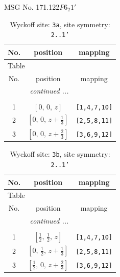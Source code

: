 \documentclass[fleqn,8pt]{jsarticle}
\begin{document}
\setcounter{MaxMatrixCols}{32}

\renewcommand{\tablename}{Table~}
\renewcommand{\figurename}{Figure~}
\begin{center}
\LARGE
MSG No. 171.122\quad$P6_{2}1'$
\end{center}
\renewcommand{\arraystretch}{1.2}
\begin{longtable}{ccc}
\caption{Wyckoff site: {\tt 3a}, site symmetry: {\tt 2..1'}}
 \\
 \hline \hline
No. & position & mapping \\ \hline \endfirsthead

\multicolumn{2}{l}{\tablename\ \thetable{}} \\
 \hline \hline
No. & position & mapping \\ \hline \endhead

 \hline \hline
\multicolumn{2}{r}{\footnotesize\it continued ...} \\ \endfoot

 \hline \hline
\multicolumn{2}{r}{} \\ \endlastfoot

1 & $\left[ 0,\, 0,\, z \right]$ & {\tt [1,4,7,10]} \\ \hline
2 & $\left[ 0,\, 0,\, z + \frac{1}{3} \right]$ & {\tt [2,5,8,11]} \\ \hline
3 & $\left[ 0,\, 0,\, z + \frac{2}{3} \right]$ & {\tt [3,6,9,12]} \\
\end{longtable}
\renewcommand{\arraystretch}{1.2}
\begin{longtable}{ccc}
\caption{Wyckoff site: {\tt 3b}, site symmetry: {\tt 2..1'}}
 \\
 \hline \hline
No. & position & mapping \\ \hline \endfirsthead

\multicolumn{2}{l}{\tablename\ \thetable{}} \\
 \hline \hline
No. & position & mapping \\ \hline \endhead

 \hline \hline
\multicolumn{2}{r}{\footnotesize\it continued ...} \\ \endfoot

 \hline \hline
\multicolumn{2}{r}{} \\ \endlastfoot

1 & $\left[ \frac{1}{2},\, \frac{1}{2},\, z \right]$ & {\tt [1,4,7,10]} \\ \hline
2 & $\left[ 0,\, \frac{1}{2},\, z + \frac{1}{3} \right]$ & {\tt [2,5,8,11]} \\ \hline
3 & $\left[ \frac{1}{2},\, 0,\, z + \frac{2}{3} \right]$ & {\tt [3,6,9,12]} \\
\end{longtable}
\end{document}
